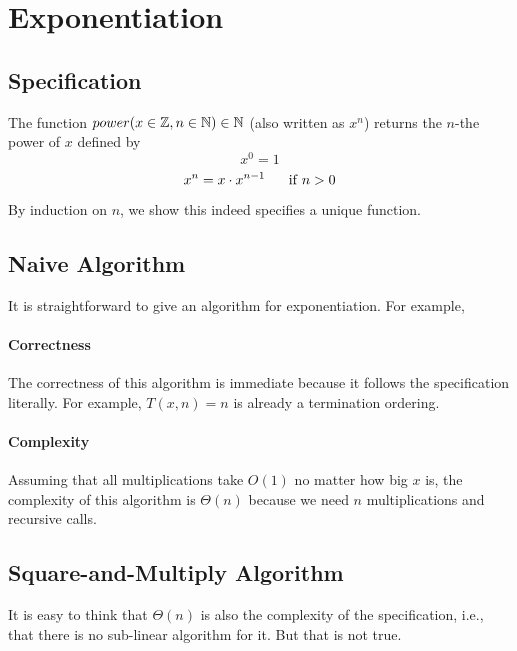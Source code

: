 \section{Exponentiation}\label{sec:ad:exp}

\subsection{Specification}\label{sec:ad:exp:spec}

The function $power(x\in\mathbb{Z},n\in\mathbb{N})\in\mathbb{N}$ (also written as $x^n$) returns the $n$-the power of $x$ defined by
\[x^0=1\]
\[x^{n}=x\cdot x^{n-1} \hspace*{.5cm}\;\mathrm{if}\; n > 0\]

By induction on $n$, we show this indeed specifies a unique function.

\subsection{Naive Algorithm}\label{sec:ad:exp:naive}

It is straightforward to give an algorithm for exponentiation.
For example,
\begin{acode}
\end{acode}

\paragraph{Correctness}
The correctness of this algorithm is immediate because it follows the specification literally.
For example, $T(x,n)=n$ is already a termination ordering.

\paragraph{Complexity}
Assuming that all multiplications take $O(1)$ no matter how big $x$ is, the complexity of this algorithm is $\Theta(n)$ because we need $n$ multiplications and recursive calls.

\subsection{Square-and-Multiply Algorithm}\label{sec:ad:exp:sqmult}

It is easy to think that $\Theta(n)$ is also the complexity of the specification, i.e., that there is no sub-linear algorithm for it.
But that is not true.

